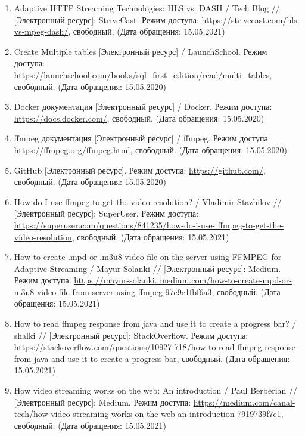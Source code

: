 \begin{enumerate}
    \item Adaptive HTTP Streaming Technologies: HLS vs. DASH / Tech Blog // [Электронный ресурс]: StriveCast. Режим доступа: \url{https://strivecast.com/hls-vs-mpeg-dash/}, свободный. (Дата обращения: 15.05.2021)
    \item Create Multiple tables [Электронный ресурс] / LaunchSchool. Режим доступа: \url{https://launchschool.com/books/sql_first_edition/read/multi_tables}, свободный. (Дата обращения: 15.05.2020)
    \item Docker документация [Электронный ресурс] / Docker. Режим доступа: \url{https://docs.docker.com/}, свободный. (Дата обращения: 15.05.2020)
    \item ffmpeg документация [Электронный ресурс] / ffmpeg. Режим доступа: \url{https://ffmpeg.org/ffmpeg.html}, свободный. (Дата обращения: 15.05.2020)
    \item GitHub [Электронный ресурс]. Режим доступа: \url{https://github.com/}, свободный. (Дата обращения: 15.05.2020)
    \item How do I use ffmpeg to get the video resolution? / Vladimir Stazhilov // [Электронный ресурс]: SuperUser. Режим доступа: \href{https://superuser.com/questions/841235/how-do-i-use-ffmpeg-to-get-the-video-resolution}{https://superuser.com/questions/841235/how-do-i-use- ffmpeg-to-get-the-video-resolution}, свободный. (Дата обращения: 15.05.2021)
    \item How to create .mpd or .m3u8 video file on the server using FFMPEG for Adaptive Streaming / Mayur Solanki // [Электронный ресурс]: Medium. Режим доступа: \href{https://mayur-solanki.medium.com/how-to-create-mpd-or-m3u8-video-file-from-server-using-ffmpeg-97e9e1fbf6a3}{https://mayur-solanki. medium.com/how-to-create-mpd-or-m3u8-video-file-from-server-using-ffmpeg-97e9e1fbf6a3}, свободный. (Дата обращения: 15.05.2021)
    \item How to read ffmpeg response from java and use it to create a progress bar? / shalki // [Электронный ресурс]: StackOverflow. Режим доступа: \href{https://stackoverflow.com/questions/10927718/how-to-read-ffmpeg-response-from-java-and-use-it-to-create-a-progress-bar}{https://stackoverflow.com/questions/10927 718/how-to-read-ffmpeg-response-from-java-and-use-it-to-create-a-progress-bar}, свободный. (Дата обращения: 15.05.2021)
    \item How video streaming works on the web: An introduction / Paul Berberian // [Электронный ресурс]: Medium. Режим доступа: \href{https://medium.com/canal-tech/how-video-streaming-works-on-the-web-an-introduction-7919739f7e1}{https://medium.com/canal-tech/how-video-streaming-works-on-the-web-an-introduction-7919739f7e1}, свободный. (Дата обращения: 15.05.2021)

\end{enumerate}
